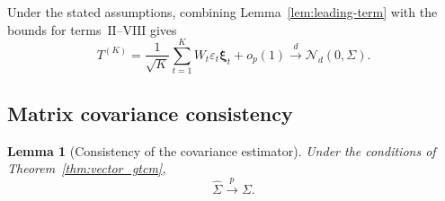 \documentclass[12pt]{article}
\newtheorem{lemma}[theorem]{Lemma}
\numberwithin{equation}{section}
\begin{document}
Under the stated assumptions, combining
Lemma~\ref{lem:leading-term} with the bounds for
terms~\(\mathrm{II}\)--\(\mathrm{VIII}\) gives
\begin{equation}
\label{eq:numerator}
T^{(K)}
=
\frac{1}{\sqrt K}\sum_{t=1}^K
W_t\varepsilon_t\boldsymbol\xi_t
+o_p(1)
\xrightarrow{d}\mathcal N_d(0,\Sigma).
\end{equation}
 

\subsection{Matrix covariance consistency}

\begin{lemma}[Consistency of the covariance estimator]
\label{lem:matrix-covariance-consistency}
Under the conditions of Theorem~\ref{thm:vector_gtcm},
\[
\hat\Sigma\xrightarrow{p}\Sigma.
\]
\end{lemma}
\end{document}
